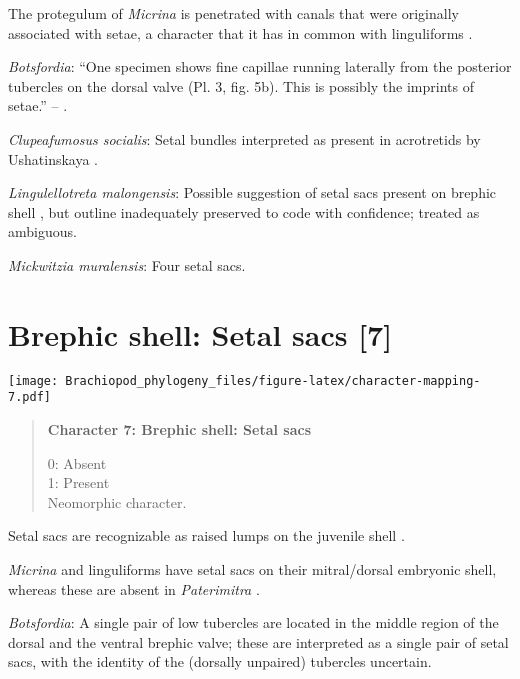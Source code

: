 \documentclass[openany]{book}
\theoremstyle{definition}
\theoremstyle{definition}
\theoremstyle{definition}
\theoremstyle{remark}
\begin{document}
The protegulum of \emph{Micrina} is penetrated with canals that were
originally associated with setae, a character that it has in common with
linguliforms \citep{Holmer2011Firstrecord}.

\hypertarget{Botsfordia-coding-6}{}
\emph{Botsfordia}: ``One specimen shows fine capillae running laterally
from the posterior tubercles on the dorsal valve (Pl. 3, fig. 5b). This
is possibly the imprints of setae.'' --
\citet{Ushatinskaya2016Revisionof}.

\hypertarget{Clupeafumosus_socialis-coding-6}{}
\emph{Clupeafumosus socialis}: Setal bundles interpreted as present in
acrotretids by Ushatinskaya \citeyearpar{Ushatinskaya2016Protegulumand}.

\hypertarget{Lingulellotreta_malongensis-coding-6}{}
\emph{Lingulellotreta malongensis}: Possible suggestion of setal sacs
present on brephic shell \citep{Holmer1997EarlyCambrian, Li2004}, but
outline inadequately preserved to code with confidence; treated as
ambiguous.

\hypertarget{Mickwitzia_muralensis-coding-6}{}
\emph{Mickwitzia muralensis}: Four setal sacs.

\section{Brephic shell: Setal sacs
{[}7{]}}\label{brephic-shell-setal-sacs-7}

\texttt{[image: Brachiopod\_phylogeny\_files/figure-latex/character-mapping-7.pdf]}

\begin{quote}
\textbf{Character 7: Brephic shell: Setal sacs}

0: Absent\\
1: Present\\
Neomorphic character.
\end{quote}

Setal sacs are recognizable as raised lumps on the juvenile shell
\citep[see][]{Bassett2017Earliestontogeny}.

\emph{Micrina} and linguliforms have setal sacs on their mitral/dorsal
embryonic shell, whereas these are absent in \emph{Paterimitra}
\citep{Holmer2011Firstrecord}.

\hypertarget{Botsfordia-coding-7}{}
\emph{Botsfordia}: A single pair of low tubercles are \citep[ state
``may be'']{Ushatinskaya2016Revisionof} located in the middle region of
the dorsal and the ventral brephic valve; these are interpreted as a
single pair of setal sacs, with the identity of the (dorsally unpaired)
tubercles uncertain.
\end{document}
